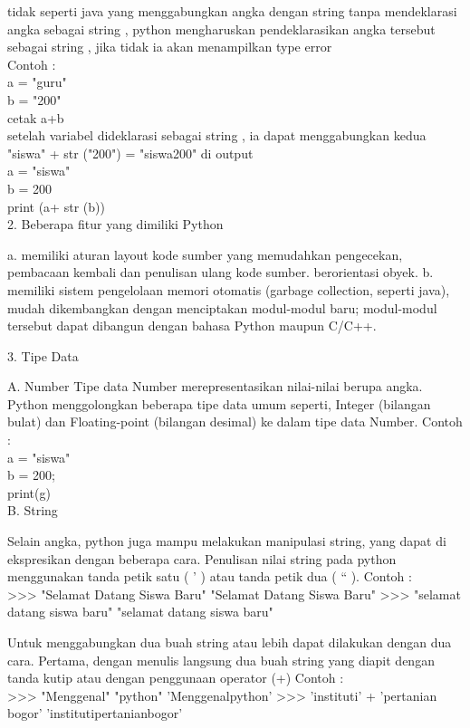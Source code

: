     tidak seperti java yang menggabungkan angka dengan string tanpa mendeklarasi angka sebagai string , python mengharuskan pendeklarasikan angka tersebut sebagai string , jika tidak ia akan menampilkan type error\\
    Contoh :\\
    a = "guru"\\
    b = "200"\\
    cetak a+b\\
    
    setelah variabel dideklarasi sebagai string , ia dapat menggabungkan kedua "siswa" + str ("200") = "siswa200" di output\\
    a = "siswa"\\
    b = 200\\
    print (a+ str (b))\\
    
2. Beberapa fitur yang dimiliki Python
    
    a. memiliki aturan layout kode sumber yang memudahkan pengecekan, pembacaan kembali dan penulisan ulang kode sumber. berorientasi obyek. 
    b. memiliki sistem pengelolaan memori otomatis (garbage collection, seperti java), mudah dikembangkan dengan menciptakan modul-modul baru; modul-modul tersebut dapat dibangun dengan bahasa Python maupun C/C++.

3. Tipe Data

A. Number
    Tipe data Number merepresentasikan nilai-nilai berupa angka. Python menggolongkan beberapa tipe data umum seperti, Integer (bilangan bulat) dan Floating-point (bilangan desimal) ke dalam tipe data Number.
    Contoh :\\
    a = "siswa"\\
    b = 200;\\
    print(g)\\
    
B. String
    
    Selain angka, python juga mampu melakukan manipulasi string, yang dapat di ekspresikan dengan beberapa cara. Penulisan nilai string pada python menggunakan tanda petik satu ( ' ) atau tanda petik dua ( “ ).
    Contoh :\\
    >>> "Selamat Datang Siswa Baru"
    "Selamat Datang Siswa Baru"
    >>> "selamat datang siswa baru"
    "selamat datang siswa baru"
    
    Untuk menggabungkan dua buah string atau lebih dapat dilakukan dengan dua cara. Pertama, dengan menulis langsung dua buah string yang diapit dengan tanda kutip atau dengan penggunaan operator (+)
    Contoh :\\
    >>> "Menggenal" "python"
    'Menggenalpython'
    >>> 'instituti' + 'pertanian bogor'
    'institutipertanianbogor'
    
